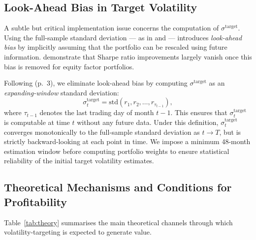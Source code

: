 \documentclass[12pt, a4paper]{article}
\newcommand{\stgt}{\sigma^{\mathrm{target}}}
\begin{document}
\subsection{Look-Ahead Bias in Target Volatility}
\label{sec:lookahead}

A subtle but critical implementation issue concerns the computation of $\stgt$. Using the
full-sample standard deviation --- as in \citet{Moreira2017} and \citet{Harvey2018} ---
introduces \emph{look-ahead bias} by implicitly assuming that the portfolio can be
rescaled using future information. \citet{Liu2019} demonstrate that Sharpe ratio
improvements largely vanish once this bias is removed for equity factor portfolios.

Following \citet{Bongaerts2020} (p.~3), we eliminate look-ahead bias by computing
$\stgt$ as an \emph{expanding-window} standard deviation:
\begin{equation}
  \stgt_t = \mathrm{std}(r_1, r_2, \ldots, r_{\tau_{t-1}}),
  \label{eq:target}
\end{equation}
where $\tau_{t-1}$ denotes the last trading day of month $t-1$. This ensures that
$\stgt_t$ is computable at time $t$ without any future data. Under this definition,
$\stgt_t$ converges monotonically to the full-sample standard deviation as $t \to T$, but
is strictly backward-looking at each point in time. We impose a minimum 48-month
estimation window before computing portfolio weights to ensure statistical reliability of
the initial target volatility estimates.

\subsection{Theoretical Mechanisms and Conditions for Profitability}

Table~\ref{tab:theory} summarises the main theoretical channels through which
volatility-targeting is expected to generate value.
\end{document}
